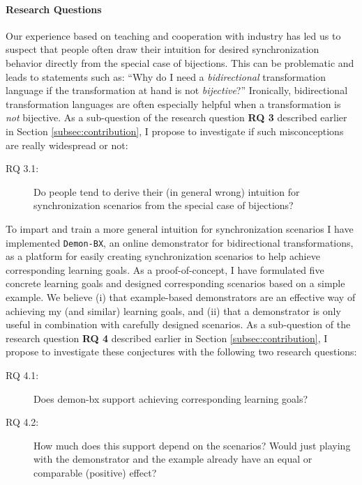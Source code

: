 \paragraph{Research Questions}
Our experience based on teaching and cooperation with industry has led us to suspect that people often draw their intuition for desired synchronization behavior directly from the special case of bijections.
This can be problematic and leads to statements such as: ``Why do I need a \emph{bidirectional} transformation language if the transformation at hand is not \emph{bijective}?''
Ironically, bidirectional transformation languages are often especially helpful when a transformation is \emph{not} bijective. As a sub-question of the research question \textbf{RQ 3} described earlier in Section \ref{subsec:contribution}, I propose to investigate if such misconceptions are really widespread or not:

\begin{description}
	\item[RQ 3.1:] Do people tend to derive their (in general wrong) intuition for synchronization scenarios from the special case of bijections?
\end{description}

To impart and train a more general intuition for synchronization scenarios I have implemented \texttt{Demon-BX}, an online demonstrator for bidirectional transformations, as a platform for easily creating synchronization scenarios to help achieve corresponding learning goals.
As a proof-of-concept, I have formulated five concrete learning goals and designed corresponding scenarios based on a simple example. We believe (i) that example-based demonstrators are an effective way of achieving my (and similar) learning goals, and (ii) that a demonstrator is only useful in combination with carefully designed scenarios. As a sub-question of the research question \textbf{RQ 4} described earlier in Section \ref{subsec:contribution}, I propose to investigate these conjectures with the following two research questions: 

\begin{description}
	\item[RQ 4.1:] Does demon-bx support achieving corresponding learning goals?
	\item[RQ 4.2:] How much does this support depend on the scenarios?  Would just playing with the demonstrator and the example already have an equal or comparable (positive) effect?
\end{description}

